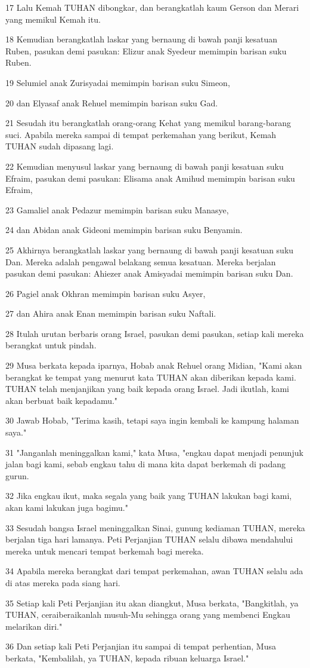 \par 17 Lalu Kemah TUHAN dibongkar, dan berangkatlah kaum Gerson dan Merari yang memikul Kemah itu.
\par 18 Kemudian berangkatlah laskar yang bernaung di bawah panji kesatuan Ruben, pasukan demi pasukan: Elizur anak Syedeur memimpin barisan suku Ruben.
\par 19 Selumiel anak Zurisyadai memimpin barisan suku Simeon,
\par 20 dan Elyasaf anak Rehuel memimpin barisan suku Gad.
\par 21 Sesudah itu berangkatlah orang-orang Kehat yang memikul barang-barang suci. Apabila mereka sampai di tempat perkemahan yang berikut, Kemah TUHAN sudah dipasang lagi.
\par 22 Kemudian menyusul laskar yang bernaung di bawah panji kesatuan suku Efraim, pasukan demi pasukan: Elisama anak Amihud memimpin barisan suku Efraim,
\par 23 Gamaliel anak Pedazur memimpin barisan suku Manasye,
\par 24 dan Abidan anak Gideoni memimpin barisan suku Benyamin.
\par 25 Akhirnya berangkatlah laskar yang bernaung di bawah panji kesatuan suku Dan. Mereka adalah pengawal belakang semua kesatuan. Mereka berjalan pasukan demi pasukan: Ahiezer anak Amisyadai memimpin barisan suku Dan.
\par 26 Pagiel anak Okhran memimpin barisan suku Asyer,
\par 27 dan Ahira anak Enan memimpin barisan suku Naftali.
\par 28 Itulah urutan berbaris orang Israel, pasukan demi pasukan, setiap kali mereka berangkat untuk pindah.
\par 29 Musa berkata kepada iparnya, Hobab anak Rehuel orang Midian, "Kami akan berangkat ke tempat yang menurut kata TUHAN akan diberikan kepada kami. TUHAN telah menjanjikan yang baik kepada orang Israel. Jadi ikutlah, kami akan berbuat baik kepadamu."
\par 30 Jawab Hobab, "Terima kasih, tetapi saya ingin kembali ke kampung halaman saya."
\par 31 "Janganlah meninggalkan kami," kata Musa, "engkau dapat menjadi penunjuk jalan bagi kami, sebab engkau tahu di mana kita dapat berkemah di padang gurun.
\par 32 Jika engkau ikut, maka segala yang baik yang TUHAN lakukan bagi kami, akan kami lakukan juga bagimu."
\par 33 Sesudah bangsa Israel meninggalkan Sinai, gunung kediaman TUHAN, mereka berjalan tiga hari lamanya. Peti Perjanjian TUHAN selalu dibawa mendahului mereka untuk mencari tempat berkemah bagi mereka.
\par 34 Apabila mereka berangkat dari tempat perkemahan, awan TUHAN selalu ada di atas mereka pada siang hari.
\par 35 Setiap kali Peti Perjanjian itu akan diangkut, Musa berkata, "Bangkitlah, ya TUHAN, ceraiberaikanlah musuh-Mu sehingga orang yang membenci Engkau melarikan diri."
\par 36 Dan setiap kali Peti Perjanjian itu sampai di tempat perhentian, Musa berkata, "Kembalilah, ya TUHAN, kepada ribuan keluarga Israel."

